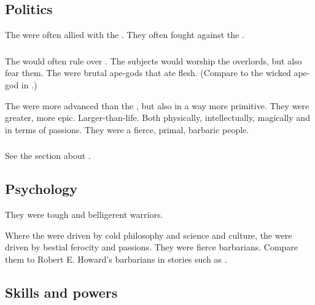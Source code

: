 \subsection{Politics}
The \aryothim{} were often allied with the \vorcanths. 
They often fought against the \quiljaaran. 





\subsubsection{\Nephilim}
The \aryothim would often rule over \nephilim.
The \nephil subjects would worship the \aryoth overlords, but also fear them. 
The \aryothim were brutal ape-gods that ate \nephil flesh.
(Compare to the wicked ape-god in \cite{RobertEHoward:TheIsleoftheEons}.)

The \aryothim were more advanced than the \nephilim, but also in a way more primitive.
They were greater, more epic. 
Larger-than-life.
Both physically, intellectually, magically and in terms of passions. 
They were a fierce, primal, barbaric people.





\subsubsection{\Ophidians}
See the section about . 









\subsection{Psychology}
They were tough and belligerent warriors. 

Where the \ophidians were driven by cold philosophy and science and culture, the \aryothim were driven by bestial ferocity and passions. 
They were fierce barbarians. 
Compare them to Robert E. Howard's barbarians in stories such as \cite{RobertEHoward:TheValleyoftheLost}. 









\subsection{Skills and powers}





